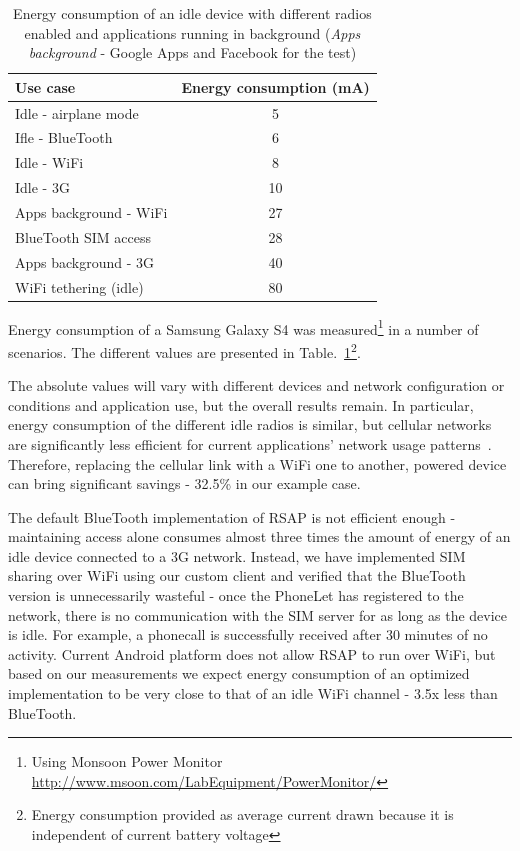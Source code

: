 \documentclass{sig-alternate-10pt}
\begin{document}
\begin{table}[t]
{
\small
\begin{tabular}{| l | c |}
\hline
  \textbf{Use case}         & \textbf{Energy consumption (mA)}  \\ \hline
  Idle - airplane mode      & 5     \\ \hline
  Ifle - BlueTooth          & 6     \\ \hline
  Idle - WiFi               & 8     \\ \hline
  Idle - 3G                 & 10    \\ \hline
  Apps background - WiFi    & 27    \\ \hline
  BlueTooth SIM access      & 28    \\ \hline
  Apps background - 3G      & 40    \\ \hline
  WiFi tethering (idle)     & 80    \\ \hline
\end{tabular}
}
\vspace{-2mm}
\caption{Energy consumption of an idle device with different radios enabled and applications running in background (\emph{Apps background} - Google Apps and Facebook for the test)}
\label{tab:energy}
\vspace{-3mm}
\end{table}

Energy consumption of a Samsung Galaxy S4 was measured\footnote{Using Monsoon Power Monitor \url{http://www.msoon.com/LabEquipment/PowerMonitor/}} in a number of scenarios. The different values are presented in Table.~\ref{tab:energy}\footnote{Energy consumption provided as average current drawn because it is independent of current battery voltage}. 

The absolute values will vary with different devices and network configuration or conditions and application use, but the overall results remain. In particular, energy consumption of the different idle radios is similar, but cellular networks are significantly less efficient for current applications' network usage patterns~\cite{Aucinas:2013uk}. Therefore, replacing the cellular link with a WiFi one to another, powered device can bring significant savings - 32.5\% in our example case.

The default BlueTooth implementation of RSAP is not efficient enough - maintaining access alone consumes almost three times the amount of energy of an idle device connected to a 3G network. Instead, we have implemented SIM sharing over WiFi using our custom client and verified that the BlueTooth version is unnecessarily wasteful - once the PhoneLet has registered to the network, there is no communication with the SIM server for as long as the device is idle. For example, a phonecall is successfully received after 30 minutes of no activity. Current Android platform does not allow RSAP to run over WiFi, but based on our measurements we expect energy consumption of an optimized implementation to be very close to that of an idle WiFi channel - 3.5x less than BlueTooth.
\end{document}
